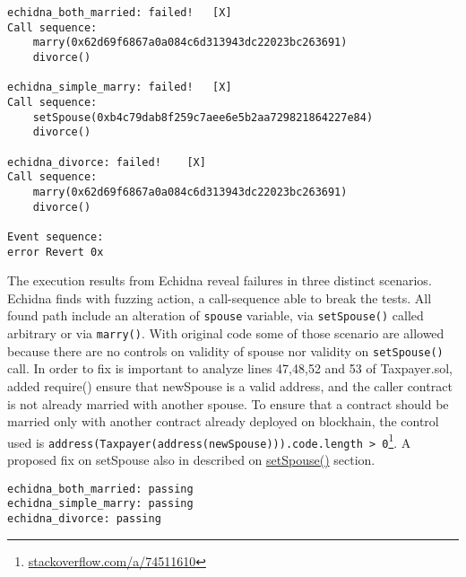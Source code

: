 \documentclass{article}
\begin{document}
\begin{verbatim}
echidna_both_married: failed!   [X]
Call sequence:
    marry(0x62d69f6867a0a084c6d313943dc22023bc263691)
    divorce()

echidna_simple_marry: failed!   [X]
Call sequence:
    setSpouse(0xb4c79dab8f259c7aee6e5b2aa729821864227e84)
    divorce()

echidna_divorce: failed!    [X]
Call sequence:
    marry(0x62d69f6867a0a084c6d313943dc22023bc263691)
    divorce()

Event sequence:
error Revert 0x
\end{verbatim} 
The execution results from Echidna reveal failures in three distinct scenarios. Echidna finds with fuzzing action, a call-sequence able to break the tests. All found path include an alteration of \texttt{spouse} variable, via \texttt{setSpouse()} called arbitrary or via \texttt{marry()}. With original code some of those scenario are allowed because there are no controls on validity of spouse nor validity on \texttt{setSpouse()} call.
In order to fix is important to analyze lines 47,48,52 and 53 of Taxpayer.sol, added require() ensure that newSpouse is a valid address, and the caller contract is not already married with another spouse.
To ensure that a contract should be married only with another contract already deployed on blockhain, the control used is \texttt{address(Taxpayer(address(newSpouse))).code.length > 0}\footnote{\href{https://stackoverflow.com/a/74511610}{stackoverflow.com/a/74511610}}.
A proposed fix on setSpouse also in described on \hyperref[sec:setspouse]{setSpouse()} section.
\begin{verbatim}
echidna_both_married: passing
echidna_simple_marry: passing
echidna_divorce: passing
\end{verbatim} 
 
\end{document}
